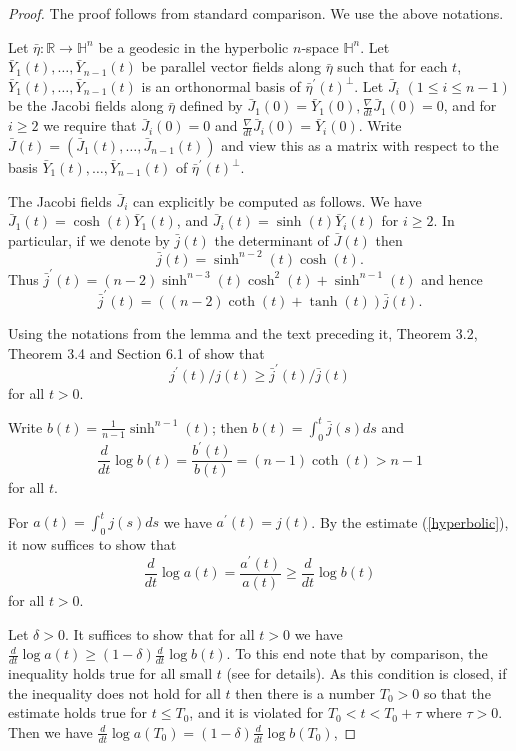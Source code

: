 \documentclass[11pt]{amsart}
\theoremstyle{plain}
\theoremstyle{plain}
\theoremstyle{definition}
\begin{document}
\begin{proof}
The proof follows from standard comparison. 
We use the above notations. 

Let $\bar \eta:\mathbb{R}\to \mathbb{H}^n$ be a geodesic in the hyperbolic $n$-space $\mathbb{H}^n$.
Let $\bar Y_1(t),\dots,\bar Y_{n-1}(t)$ be parallel vector fields along $\bar\eta$
such that for each $t$, $\bar Y_1(t),\dots,\bar Y_{n-1}(t)$ is an orthonormal basis of 
$\bar \eta^\prime(t)^\perp$. 
Let $\bar J_i$ $(1\leq i\leq n-1)$ be the Jacobi fields along $\bar\eta$ defined by 
$\bar J_1(0)=\bar Y_1(0),\frac{\nabla}{dt}\bar J_1(0)=0$, 
and for $i\geq 2$ we require that
$\bar J_i(0)=0$ and $\frac{\nabla}{dt}\bar J_i(0)=\bar Y_i(0)$. Write 
$\bar J(t)=(\bar J_1(t),\dots,\bar J_{n-1}(t))$ and view this as a matrix with respect to the
basis $\bar Y_1(t),\dots,\bar Y_{n-1}(t)$ 
of $\bar\eta^\prime(t)^\perp$.


The Jacobi fields $\bar J_i$ can explicitly be computed as follows. We have
$\bar J_1(t)=\cosh(t)\bar Y_1(t)$, and 
$\bar J_i(t)=\sinh(t)\bar Y_i(t)$ for $i\geq 2$. 
In particular, if we denote by $\bar j(t)$ the determinant
of $\bar J(t)$ then 
\[\bar j(t)=\sinh^{n-2}(t)\cosh(t).\]
Thus $\bar j^\prime(t)=(n-2)\sinh^{n-3}(t)\cosh^2(t)+
\sinh^{n-1}(t)$ and hence
\[\bar j^\prime(t)=((n-2)\coth(t)+\tanh(t))\bar j(t).\] 


Using the notations from the lemma and the text preceding it, 
Theorem 3.2, Theorem 3.4 and Section 6.1 of \cite{E87} show that 
\begin{equation}\label{eschenburg}
j^\prime(t)/j(t)\geq \bar j^\prime(t)/\bar j(t)\end{equation}
for all $t>0$. 


Write $b(t)=\frac{1}{n-1}\sinh^{n-1}(t)$; then 
$b(t)=\int_0^t\bar j(s)ds$ and 
\begin{equation}\label{hyperbolic}
\frac{d}{dt}\log b(t)=\frac{b^\prime(t)}{b(t)}=(n-1)\coth(t)>n-1
\end{equation}
for all $t$. 

For $a(t)=\int_0^tj(s)ds$ we have $a^\prime(t)=j(t)$. 
By the estimate (\ref{hyperbolic}), it now suffices to show 
that 
\[\frac{d}{dt}\log a(t)=\frac{a^\prime(t)}{a(t)}\geq \frac{d}{dt}\log b(t)\]
for all $t>0$. 

Let $\delta>0$. It suffices to show that 
for all $t>0$ we have 
$\frac{d}{dt}\log a(t)\geq (1-\delta)\frac{d}{dt}\log b(t)$. 
To this end note that by comparison, the inequality holds  true for all small $t$ (see \cite{E87} for 
details). 
As this condition is closed, if the inequality does not hold for all $t$ then 
there is a number $T_0>0$ so that the 
estimate holds true for $t\leq T_0$, and it is violated for 
$T_0<t<T_0+\tau$ where $\tau >0$. 
Then we have 
$\frac{d}{dt}\log a(T_0)=(1-\delta)\frac{d}{dt}\log b(T_0)$, 



\end{proof}
\end{document}
